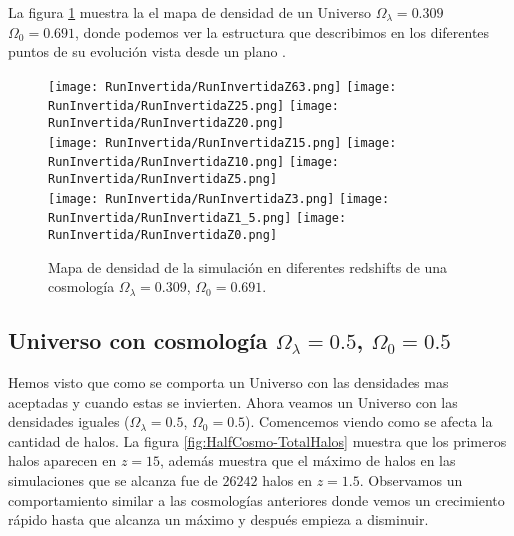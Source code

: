 La figura \ref{fig:Invertida-DensityMap} muestra la el mapa de densidad de un Universo $\Omega_\lambda = 0.309 $ $\Omega_0 = 0.691$, donde podemos ver la estructura que describimos  en los diferentes puntos de su evolución vista desde un plano .
\begin{figure}[H]
    \centering

    \texttt{[image: RunInvertida/RunInvertidaZ63.png]}   %
    \texttt{[image: RunInvertida/RunInvertidaZ25.png]}   %
    \texttt{[image: RunInvertida/RunInvertidaZ20.png]}   %
    \\
    \texttt{[image: RunInvertida/RunInvertidaZ15.png]}   %
    \texttt{[image: RunInvertida/RunInvertidaZ10.png]}   %
    \texttt{[image: RunInvertida/RunInvertidaZ5.png]}    %
    \\
    \texttt{[image: RunInvertida/RunInvertidaZ3.png]}    %
    \texttt{[image: RunInvertida/RunInvertidaZ1\_5.png]}  %
    \texttt{[image: RunInvertida/RunInvertidaZ0.png]}    %
    \caption[Mapa de densidad de un Universo $\Omega_\lambda = 0.309 $, $\Omega_0 = 0.691$ en en diferentes redshift]{ \footnotesize Mapa de densidad de la simulación en diferentes redshifts de una cosmología $\Omega_\lambda = 0.309 $, $\Omega_0 = 0.691$. }
    \label{fig:Invertida-DensityMap}
\end{figure}

\subsection{Universo con cosmología \texorpdfstring{$\Omega_\lambda = 0.5$, $\Omega_0 = 0.5$ }{Omega lambda = 0.5, Omega 0 = 0.5} }

Hemos visto que como se comporta un Universo con las densidades mas aceptadas y cuando estas se invierten. Ahora veamos un Universo con las densidades iguales ($\Omega_\lambda = 0.5$, $\Omega_0 = 0.5$). Comencemos viendo como se afecta la cantidad de halos. La figura \ref{fig:HalfCosmo-TotalHalos} muestra que los primeros halos aparecen en $z=15$, además muestra que el máximo de halos en las simulaciones que se alcanza fue de $26242$ halos en $z=1.5$. Observamos un comportamiento similar a las cosmologías anteriores donde vemos un crecimiento rápido hasta que alcanza un máximo y después empieza a disminuir.

